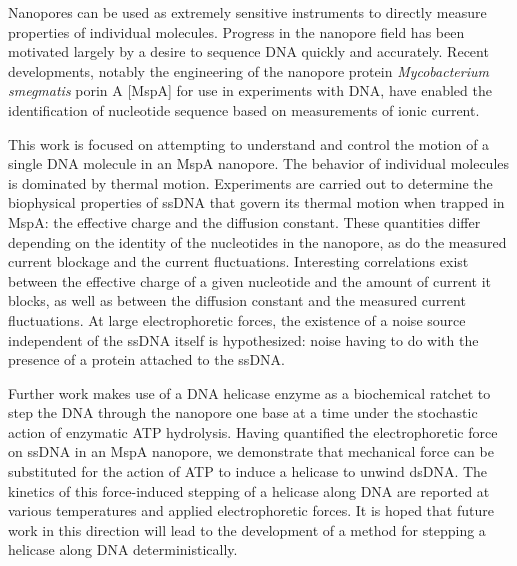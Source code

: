 
Nanopores can be used as extremely sensitive instruments to directly measure properties of individual molecules.  Progress in the nanopore field has been motivated largely by a desire to sequence DNA quickly and accurately.  Recent developments, notably the engineering of the nanopore protein \textit{Mycobacterium smegmatis} porin A [MspA] for use in experiments with DNA, have enabled the identification of nucleotide sequence based on measurements of ionic current.

This work is focused on attempting to understand and control the motion of a single DNA molecule in an MspA nanopore.  The behavior of individual molecules is dominated by thermal motion.  Experiments are carried out to determine the biophysical properties of ssDNA that govern its thermal motion when trapped in MspA: the effective charge and the diffusion constant.  These quantities differ depending on the identity of the nucleotides in the nanopore, as do the measured current blockage and the current fluctuations.  Interesting correlations exist between the effective charge of a given nucleotide and the amount of current it blocks, as well as between the diffusion constant and the measured current fluctuations.  At large electrophoretic forces, the existence of a noise source independent of the ssDNA itself is hypothesized: noise having to do with the presence of a protein attached to the ssDNA.

Further work makes use of a DNA helicase enzyme as a biochemical ratchet to step the DNA through the nanopore one base at a time under the stochastic action of enzymatic ATP hydrolysis.  Having quantified the electrophoretic force on ssDNA in an MspA nanopore, we demonstrate that mechanical force can be substituted for the action of ATP to induce a helicase to unwind dsDNA.  The kinetics of this force-induced stepping of a helicase along DNA are reported at various temperatures and applied electrophoretic forces.  It is hoped that future work in this direction will lead to the development of a method for stepping a helicase along DNA deterministically.
